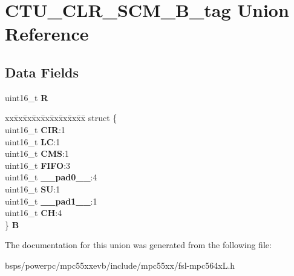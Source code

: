 \hypertarget{unionCTU__CLR__SCM__16B__tag}{}\section{C\+T\+U\+\_\+\+C\+L\+R\+\_\+\+S\+C\+M\+\_\+B\+\_\+tag Union Reference}
\label{unionCTU__CLR__SCM__16B__tag}
\subsection*{Data Fields}
\begin{DoxyCompactItemize}
\item 
\mbox{\label{unionCTU__CLR__SCM__16B__tag_a199a686497f2f6ca20132cbb51ca5202}} 
uint16\+\_\+t {\bfseries R}
\item 
\mbox{\label{unionCTU__CLR__SCM__16B__tag_a4e9a882e774594d8ce53caa0fa59abfb}} 
\begin{tabbing}
xx\=xx\=xx\=xx\=xx\=xx\=xx\=xx\=xx\=\kill
struct \{\\
\>uint16\_t {\bfseries CIR}:1\\
\>uint16\_t {\bfseries LC}:1\\
\>uint16\_t {\bfseries CMS}:1\\
\>uint16\_t {\bfseries FIFO}:3\\
\>uint16\_t {\bfseries \_\_pad0\_\_}:4\\
\>uint16\_t {\bfseries SU}:1\\
\>uint16\_t {\bfseries \_\_pad1\_\_}:1\\
\>uint16\_t {\bfseries CH}:4\\
\} {\bfseries B}\\

\end{tabbing}\end{DoxyCompactItemize}


The documentation for this union was generated from the following file\+:\begin{DoxyCompactItemize}
\item 
bsps/powerpc/mpc55xxevb/include/mpc55xx/fsl-\/mpc564x\+L.\+h\end{DoxyCompactItemize}
